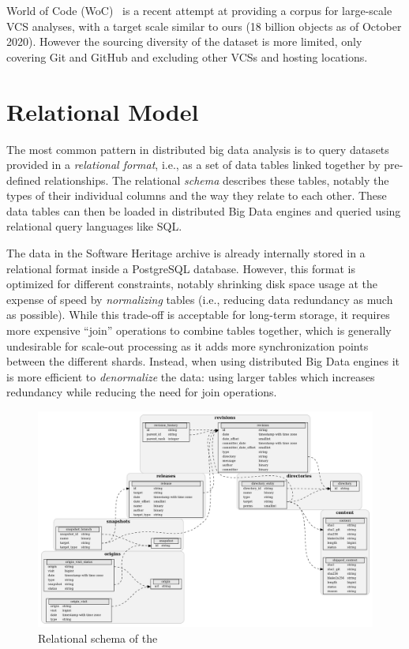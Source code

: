 World of Code (WoC)~\cite{mockus2019woc} is a recent attempt at providing a
corpus for large-scale VCS analyses, with a target scale similar to ours (18
billion objects as of October 2020). However the sourcing diversity of the
dataset is more limited, only covering Git and GitHub and excluding other
\glspl{VCS} and hosting locations.

\section{Relational Model}%
\label{sec:relational-model}

The most common pattern in distributed big data analysis is to query datasets
provided in a \emph{relational format}, i.e., as a set of data tables linked
together by pre-defined relationships. The relational \emph{schema} describes
these tables, notably the types of their individual columns and the way they
relate to each other. These data tables can then be loaded in distributed Big
Data engines and queried using relational query languages like SQL.

The data in the Software Heritage archive is already internally stored in a
relational format inside a PostgreSQL database. However, this format is
optimized for different constraints, notably shrinking disk space usage at the
expense of speed by \emph{normalizing} tables (i.e., reducing data redundancy
as much as possible). While this trade-off is acceptable for long-term storage,
it requires more expensive ``join'' operations to combine tables together,
which is generally undesirable for scale-out processing as it adds more
synchronization points between the different shards. Instead, when using
distributed Big Data engines it is more efficient to \emph{denormalize} the
data: using larger tables which increases redundancy while reducing the need
for join operations.

\begin{figure}
    \includegraphics[width=\linewidth]{img/graph-dataset/db-schema}
    \caption{Relational schema of the \SWHGD{}}%
    \label{fig:swh-dataset-schema}
\end{figure}

